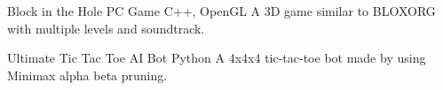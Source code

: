 


\begin{cvprojects}

    \cvproject
    {Block in the Hole} %
    {PC Game} %
    {C++, OpenGL} %
    {
        A 3D game similar to BLOXORG with multiple levels and soundtrack.
    } %



    \cvproject
    {Ultimate Tic Tac Toe} %
    {AI Bot} %
    {Python} %
    {
        A 4x4x4 tic-tac-toe bot made by using Minimax alpha beta pruning.
    } %

\end{cvprojects}
